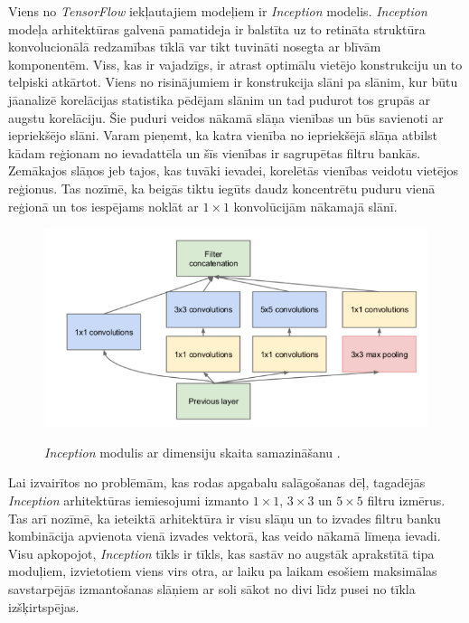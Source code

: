 \documentclass[12pt,paper=a4]{report}
\begin{document}
Viens no \textit{TensorFlow} iekļautajiem modeļiem ir \textit{Inception} modelis. \textit{Inception} modeļa arhitektūras galvenā pamatideja ir balstīta uz to retināta struktūra konvolucionālā redzamības tīklā var tikt tuvināti nosegta ar blīvām komponentēm. Viss, kas ir vajadzīgs, ir atrast optimālu vietējo konstrukciju un to telpiski atkārtot. Viens no risinājumiem ir konstrukcija slāni pa slānim, kur būtu jāanalizē korelācijas statistika pēdējam slānim un tad pudurot tos grupās ar augstu korelāciju. Šie puduri veidos nākamā slāņa vienības un būs savienoti ar iepriekšējo slāni. Varam pieņemt, ka katra vienība no iepriekšējā slāņa atbilst kādam reģionam no ievadattēla un šīs vienības ir sagrupētas filtru bankās. Zemākajos slāņos jeb tajos, kas tuvāki ievadei, korelētās vienības veidotu vietējos reģionus. Tas nozīmē, ka beigās tiktu iegūts daudz koncentrētu puduru vienā reģionā un tos iespējams noklāt ar $1 \times 1$ konvolūcijām nākamajā slānī.\cite{inception}\par
\begin{figure}[h!]
\centering
\includegraphics[width=.7\linewidth]{inception2}
\label{fig:inception2}
\caption{\textit{Inception} modulis ar dimensiju skaita samazināšanu \cite{inception}.}
\end{figure}
Lai izvairītos no problēmām, kas rodas apgabalu salāgošanas dēļ, tagadējās \textit{Inception} arhitektūras iemiesojumi izmanto $1 \times 1$, $3 \times 3$ un $5 \times 5$ filtru izmērus. Tas arī nozīmē, ka ieteiktā arhitektūra ir visu slāņu un to izvades filtru banku kombinācija apvienota vienā izvades vektorā, kas veido nākamā līmeņa ievadi. Visu apkopojot, \textit{Inception} tīkls ir tīkls, kas sastāv no augstāk aprakstītā tipa moduļiem, izvietotiem viens virs otra, ar laiku pa laikam esošiem  maksimālas savstarpējās izmantošanas slāņiem ar soli sākot no divi līdz pusei no tīkla izšķirtspējas. \cite{inception}\par
\end{document}
